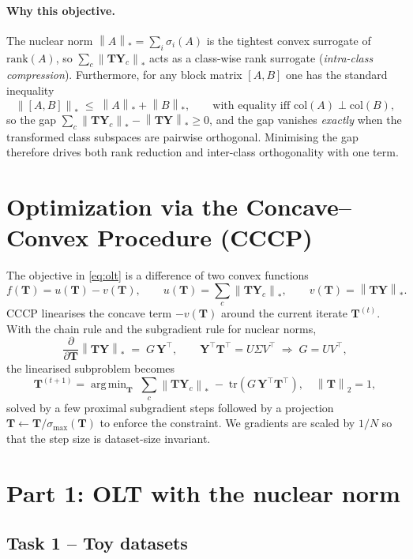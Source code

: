 \documentclass[10pt]{article}
\newcommand{\T}{\mathbf{T}}
\newcommand{\Y}{\mathbf{Y}}
\DeclareMathOperator*{\argmin}{arg\,min}
\newcommand{\nuc}[1]{\left\|#1\right\|_{\ast}}
\newcommand{\spn}[1]{\left\|#1\right\|_{2}}
\begin{document}
\paragraph{Why this objective.} The nuclear norm $\nuc{A}=\sum_i
\sigma_i(A)$ is the tightest convex surrogate of $\mathrm{rank}(A)$, so
$\sum_c\nuc{\T\Y_c}$ acts as a class-wise rank surrogate
(\emph{intra-class compression}). Furthermore, for any block matrix
$[A,B]$ one has the standard inequality
\begin{equation}
\nuc{[A,B]}\;\le\;\nuc{A}+\nuc{B},\qquad
\text{with equality iff } \mathrm{col}(A)\perp\mathrm{col}(B),
\label{eq:perp}
\end{equation}
so the gap $\sum_c\nuc{\T\Y_c}-\nuc{\T\Y}\ge 0$, and the gap vanishes
\emph{exactly} when the transformed class subspaces are pairwise
orthogonal. Minimising the gap therefore drives both rank reduction and
inter-class orthogonality with one term.

\section{Optimization via the Concave--Convex Procedure (CCCP)}
\label{sec:cccp}

The objective in \eqref{eq:olt} is a difference of two convex functions
\[
f(\T)=u(\T)-v(\T),\qquad
u(\T)=\sum_c\nuc{\T\Y_c},\qquad
v(\T)=\nuc{\T\Y}.
\]
CCCP linearises the concave term $-v(\T)$ around the current iterate
$\T^{(t)}$. With the chain rule and the subgradient rule for nuclear
norms,
\[
\frac{\partial}{\partial \T}\nuc{\T\Y}\;=\;G\,\Y^{\top},
\qquad
\Y^{\top}\T^{\top}=U\Sigma V^{\top}\;\Rightarrow\;G=UV^{\top},
\]
the linearised subproblem becomes
\begin{equation}
\T^{(t+1)}=\argmin_{\T}\;\sum_c\nuc{\T\Y_c}\;-\;\mathrm{tr}\!\left(G\,\Y^{\top}\T^{\top}\right),
\quad\spn{\T}=1,
\label{eq:cccp_inner}
\end{equation}
solved by a few proximal subgradient steps followed by a projection
$\T\leftarrow\T/\sigma_{\max}(\T)$ to enforce the constraint. We
gradients are scaled by $1/N$ so that the step size is
dataset-size invariant.

\section{Part 1: OLT with the nuclear norm}

\subsection{Task 1 -- Toy datasets}
\end{document}
